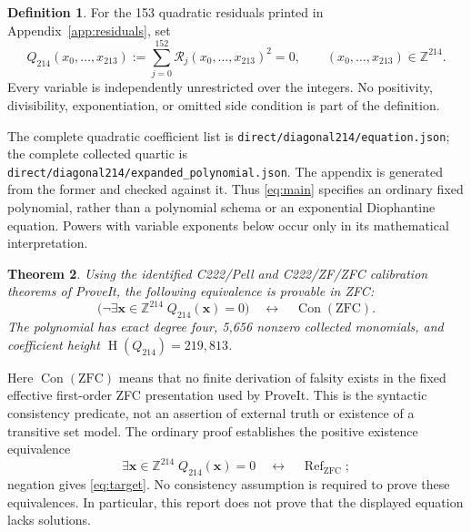 \documentclass[11pt,a4paper]{article}
\newtheorem{theorem}{Theorem}[section]
\theoremstyle{definition}
\newtheorem{definition}[theorem]{Definition}
\newcommand{\Z}{\mathbb Z}
\newcommand{\Con}{\operatorname{Con}}
\newcommand{\ZFCrefut}{\operatorname{Ref}_{\mathrm{ZFC}}}
\newcommand{\R}{\mathcal R}
\newcommand{\Qdiag}{Q_{214}}
\newcommand{\file}[1]{\nolinkurl{#1}}
\newcommand{\height}{\operatorname{H}}
\begin{document}
\begin{definition}
For the 153 quadratic residuals printed in Appendix~\ref{app:residuals}, set
\begin{equation}\label{eq:main}
 \boxed{\quad \Qdiag(x_0,\ldots,x_{213})
       :=\sum_{j=0}^{152}\R_j(x_0,\ldots,x_{213})^2=0,
       \qquad (x_0,\ldots,x_{213})\in\Z^{214}.\quad}
\end{equation}
Every variable is independently unrestricted over the integers. No
positivity, divisibility, exponentiation, or omitted side condition is
part of the definition.
\end{definition}

The complete quadratic coefficient list is
\file{direct/diagonal214/equation.json}; the complete collected quartic is
\file{direct/diagonal214/expanded_polynomial.json}. The appendix is generated
from the former and checked against it. Thus \eqref{eq:main} specifies an
ordinary fixed polynomial, rather than a polynomial schema or an
exponential Diophantine equation. Powers with variable exponents below
occur only in its mathematical interpretation.

\begin{theorem}\label{thm:main}
Using the identified C222/Pell and C222/ZF/ZFC calibration theorems of
ProveIt, the following equivalence is provable in ZFC:
\begin{equation}\label{eq:target}
 \bigl(\neg\exists\mathbf x\in\Z^{214}\;\Qdiag(\mathbf x)=0\bigr)
 \quad\longleftrightarrow\quad \Con(\mathrm{ZFC}).
\end{equation}
The polynomial has exact degree four, 5,656 nonzero collected monomials,
and coefficient height $\height(\Qdiag)=219{,}813$.
\end{theorem}

Here $\Con(\mathrm{ZFC})$ means that no finite derivation of falsity exists
in the fixed effective first-order ZFC presentation used by ProveIt.
This is the syntactic consistency predicate, not an assertion of external
truth or existence of a transitive set model. The ordinary proof establishes
the positive existence equivalence
\begin{equation}\label{eq:positive}
 \exists\mathbf x\in\Z^{214}\;\Qdiag(\mathbf x)=0
 \quad\longleftrightarrow\quad \ZFCrefut;
\end{equation}
negation gives \eqref{eq:target}. No consistency assumption is required
to prove these equivalences. In particular, this report does not prove
that the displayed equation lacks solutions.
\end{document}
